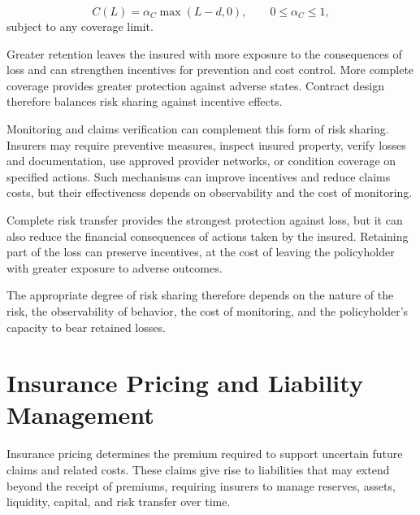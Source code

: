 \begin{equation}
C(L)
=\alpha_C\max(L-d,0),
\qquad 0\leq\alpha_C\leq 1,
\label{eq:ch15-coinsurance-payoff}
\end{equation}
subject to any coverage limit.

Greater retention leaves the insured with more exposure to the consequences of loss and can strengthen incentives for prevention and cost control. More complete coverage provides greater protection against adverse states. Contract design therefore balances risk sharing against incentive effects.

Monitoring and claims verification can complement this form of risk sharing. Insurers may require preventive measures, inspect insured property, verify losses and documentation, use approved provider networks, or condition coverage on specified actions. Such mechanisms can improve incentives and reduce claims costs, but their effectiveness depends on observability and the cost of monitoring.

\begin{tcolorbox}[
enhanced,
breakable,
colback=white,
colframe=FinanceBlue,
boxrule=0.7pt,
sharp corners,
borderline west={2.2pt}{0pt}{FinanceBlue},
title=\textbf{Financial Perspective: More Coverage Can Weaken Incentives},
coltitle=white,
colbacktitle=FinanceBlue,
fonttitle=\bfseries,
before skip=1.2em,
after skip=1.2em
]

Complete risk transfer provides the strongest protection against loss, but it can also reduce the financial consequences of actions taken by the insured. Retaining part of the loss can preserve incentives, at the cost of leaving the policyholder with greater exposure to adverse outcomes.

The appropriate degree of risk sharing therefore depends on the nature of the risk, the observability of behavior, the cost of monitoring, and the policyholder's capacity to bear retained losses.

\end{tcolorbox}


\section[Insurance Pricing and Liability Management]{Insurance Pricing and Liability \\Management}

Insurance pricing determines the premium required to support uncertain future claims and related costs. These claims give rise to liabilities that may extend beyond the receipt of premiums, requiring insurers to manage reserves, assets, liquidity, capital, and risk transfer over time.


